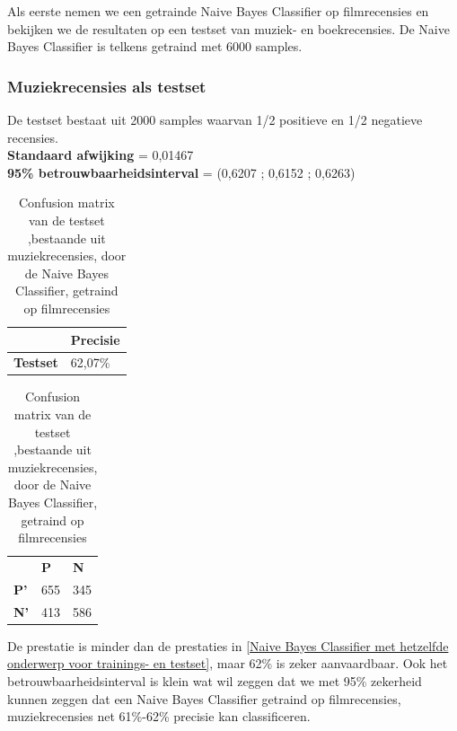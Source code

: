 \begin{appendices}
Als eerste nemen we een getrainde Naive Bayes Classifier op filmrecensies en bekijken we de resultaten op een testset van muziek- en boekrecensies. De Naive Bayes Classifier is telkens getraind met 6000 samples.

\subsubsection{Muziekrecensies als testset}\label{Muziekrecensies als testset-movie}

De testset bestaat uit 2000 samples waarvan 1/2 positieve en 1/2 negatieve recensies.\\

\textbf{Standaard afwijking} = 0,01467\\
\textbf{95\% betrouwbaarheidsinterval} = (0,6207 ; 0,6152 ; 0,6263)\\
 
\begin{table}[h]
\centering
\setlength\tabcolsep{4pt}
\begin{minipage}[t]{0.48\textwidth}
\centering
\begin{tabular}{l|l|}
\cline{2-2}
                                            & \textbf{Precisie} \\ \hline
\multicolumn{1}{|l|}{\textbf{Testset}}      & 62,07\%           \\ \hline
\end{tabular}
\caption{Classificatieprecisie Naive Bayes Classifier, getraind op filmrecensies, getest op muziekrecensies}
\end{minipage}%
\hfill
\begin{minipage}[t]{0.48\textwidth}
\centering
\begin{tabular}{lll}
                                 & \textbf{P}               & \textbf{N}               \\ \cline{2-3} 
\multicolumn{1}{l|}{\textbf{P'}} & \multicolumn{1}{l|}{655} & \multicolumn{1}{l|}{345} \\ \cline{2-3} 
\multicolumn{1}{l|}{\textbf{N'}} & \multicolumn{1}{l|}{413} & \multicolumn{1}{l|}{586} \\ \cline{2-3} 
\end{tabular}
\caption{Confusion matrix van de testset ,bestaande uit muziekrecensies, door de  Naive Bayes Classifier, getraind op filmrecensies} 
\end{minipage}
\end{table}

De prestatie is minder dan de prestaties in \ref{Naive Bayes Classifier met hetzelfde onderwerp voor trainings- en testset}, maar 62\% is zeker aanvaardbaar. Ook het betrouwbaarheidsinterval is klein wat wil zeggen dat we  met 95\% zekerheid kunnen zeggen dat een Naive Bayes Classifier getraind op filmrecensies, muziekrecensies net 61\%-62\% precisie kan classificeren.  


\end{appendices}
